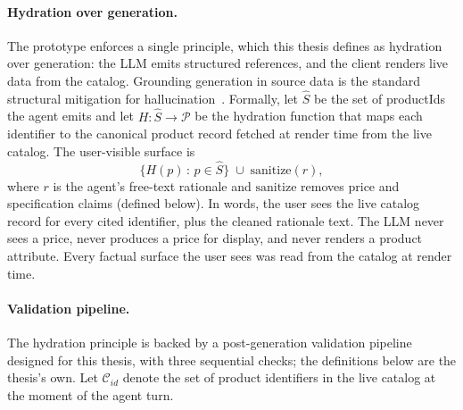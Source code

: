 \paragraph{Hydration over generation.} The prototype enforces a
single principle, which this thesis defines as hydration over
generation: the LLM emits structured references, and the
client renders live data from the catalog. Grounding generation
in source data is the standard structural mitigation for
hallucination~\cite{HallucinationSurvey2023}. Formally, let $\hat{S}$
be the set of productIds the agent emits and let $H : \hat{S} \to
\mathcal{P}$ be the hydration function that maps each identifier
to the canonical product record fetched at render time from the
live catalog. The user-visible surface is
\begin{equation}
  \{ H(p) \,:\, p \in \hat{S} \} \;\cup\; \mathrm{sanitize}(r),
  \label{eq:hydration}
\end{equation}
where $r$ is the agent's free-text rationale and $\mathrm{sanitize}$
removes price and specification claims (defined below). In words,
the user sees the live catalog record for every cited identifier,
plus the cleaned rationale text. The LLM
never sees a price, never produces a price for display, and never
renders a product attribute. Every factual surface the user sees
was read from the catalog at render time.

\paragraph{Validation pipeline.} The hydration principle is
backed by a post-generation validation pipeline designed for
this thesis, with three sequential checks; the definitions below
are the thesis's own. Let $\mathcal{C}_{id}$ denote the set of
product identifiers in the live catalog at the moment of the
agent turn.


